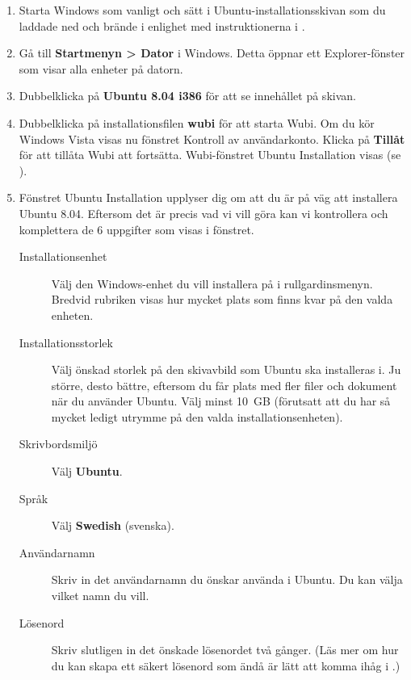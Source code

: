 \documentclass[a4paper,final]{memoir} %
\begin{document}
\begin{enumerate}

\item Starta Windows som vanligt och sätt i Ubuntu-installationsskivan som du laddade ned och brände i enlighet med instruktionerna i .

\item Gå till \textbf{Startmenyn \textgreater{} Dator} i Windows. Detta öppnar ett Explorer-fönster som visar alla enheter på datorn. 

\item Dubbelklicka på \textbf{Ubuntu 8.04 i386} för att se innehållet på skivan.

\item Dubbelklicka på installationsfilen \textbf{wubi} för att starta Wubi. Om du kör Windows Vista visas nu fönstret Kontroll av användarkonto. Klicka på \textbf{Tillåt} för att tillåta Wubi att fortsätta. Wubi-fönstret Ubuntu Installation visas (se ).

\item Fönstret Ubuntu Installation upplyser dig om att du är på väg att installera Ubuntu 8.04. Eftersom det är precis vad vi vill göra kan vi kontrollera och komplettera de 6 uppgifter som visas i fönstret.

\begin{description}
	
\item[Installationsenhet] Välj den Windows-enhet du vill installera på i rullgardinsmenyn. Bredvid rubriken visas hur mycket plats som finns kvar på den valda enheten.

\item[Installationsstorlek] Välj önskad storlek på den skivavbild som Ubuntu ska installeras i. Ju större, desto bättre, eftersom du får plats med fler filer och dokument när du använder Ubuntu. Välj minst 10~GB (förutsatt att du har så mycket ledigt utrymme på den valda installationsenheten).

\item[Skrivbordsmiljö] Välj \textbf{Ubuntu}.

\item[Språk] Välj \textbf{Swedish} (svenska).

\item[Användarnamn] Skriv in det användarnamn du önskar använda i Ubuntu. Du kan välja vilket namn du vill.

\item[Lösenord] Skriv slutligen in det önskade lösenordet två gånger. (Läs mer om hur du kan skapa ett säkert lösenord som ändå är lätt att komma ihåg i .)


\end{description}
\end{enumerate}
\end{document}
